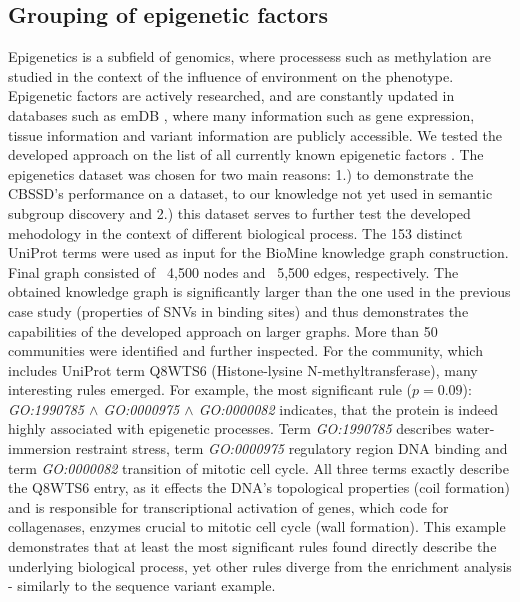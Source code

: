 \documentclass[oribibl,runningheads,a4paper]{llncs}
\begin{document}
\subsection{Grouping of epigenetic factors}
Epigenetics is a subfield of genomics, where processess such as methylation are studied in the context of the influence of environment on the phenotype. Epigenetic factors are actively researched, and are constantly updated in databases such as emDB \cite{nanda2016dbem}, where many information such as gene expression, tissue information and variant information are publicly accessible. We tested the developed approach on the list of all currently known epigenetic factors \cite{nanda2016dbem}. The epigenetics dataset was chosen for two main reasons: 1.) to demonstrate the CBSSD's performance on a dataset, to our knowledge not yet used in semantic subgroup discovery and 2.) this dataset serves to further test the developed mehodology in the context of different biological process. The 153 distinct UniProt terms were used as input for the BioMine knowledge graph construction. Final graph consisted of ~4,500 nodes and ~5,500 edges, respectively. The obtained knowledge graph is significantly larger than the one used in the previous case study (properties of SNVs in binding sites) and thus demonstrates the capabilities of the developed approach on larger graphs. More than 50 communities were identified and further inspected. For the community, which includes UniProt term Q8WTS6 (Histone-lysine N-methyltransferase), many interesting rules emerged. For example, the most significant rule ($p=0.09$): \emph{GO:1990785 $\wedge$ GO:0000975 $\wedge$ GO:0000082} indicates, that the protein is indeed highly associated with epigenetic processes. Term \emph{GO:1990785} describes water-immersion restraint stress, term \emph{GO:0000975} regulatory region DNA binding and term \emph{GO:0000082} transition of mitotic cell cycle. All three terms exactly describe the Q8WTS6 entry, as it effects the DNA's topological properties (coil formation) and is responsible for transcriptional activation of genes, which code for collagenases, enzymes crucial to mitotic cell cycle (wall formation). This example demonstrates that at least the most significant rules found directly describe the underlying biological process, yet other rules diverge from the enrichment analysis - similarly to the sequence variant example.
\end{document}
